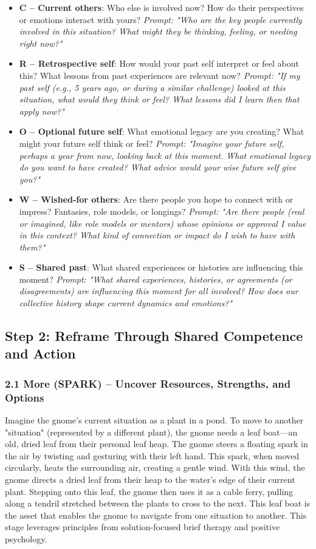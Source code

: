 \documentclass{article}
\begin{document}
\begin{itemize}[noitemsep,topsep=0pt]
    \item \textbf{C – Current others}: Who else is involved now? How do their perspectives or emotions interact with yours? \textit{Prompt: "Who are the key people currently involved in this situation? What might they be thinking, feeling, or needing right now?"}
    \item \textbf{R – Retrospective self}: How would your past self interpret or feel about this? What lessons from past experiences are relevant now? \textit{Prompt: "If my past self (e.g., 5 years ago, or during a similar challenge) looked at this situation, what would they think or feel? What lessons did I learn then that apply now?"}
    \item \textbf{O – Optional future self}: What emotional legacy are you creating? What might your future self think or feel? \textit{Prompt: "Imagine your future self, perhaps a year from now, looking back at this moment. What emotional legacy do you want to have created? What advice would your wise future self give you?"}
    \item \textbf{W – Wished-for others}: Are there people you hope to connect with or impress? Fantasies, role models, or longings? \textit{Prompt: "Are there people (real or imagined, like role models or mentors) whose opinions or approval I value in this context? What kind of connection or impact do I wish to have with them?"}
    \item \textbf{S – Shared past}: What shared experiences or histories are influencing this moment? \textit{Prompt: "What shared experiences, histories, or agreements (or disagreements) are influencing this moment for all involved? How does our collective history shape current dynamics and emotions?"}
\end{itemize}

\subsection{Step 2: Reframe Through Shared Competence and Action}

\subsubsection{2.1 More (SPARK) – Uncover Resources, Strengths, and Options}
Imagine the gnome's current situation as a plant in a pond. To move to another "situation" (represented by a different plant), the gnome needs a leaf boat—an old, dried leaf from their personal leaf heap. The gnome steers a floating spark in the air by twisting and gesturing with their left hand. This spark, when moved circularly, heats the surrounding air, creating a gentle wind. With this wind, the gnome directs a dried leaf from their heap to the water’s edge of their current plant. Stepping onto this leaf, the gnome then uses it as a cable ferry, pulling along a tendril stretched between the plants to cross to the next. This leaf boat is the asset that enables the gnome to navigate from one situation to another. This stage leverages principles from solution-focused brief therapy and positive psychology.
\end{document}

